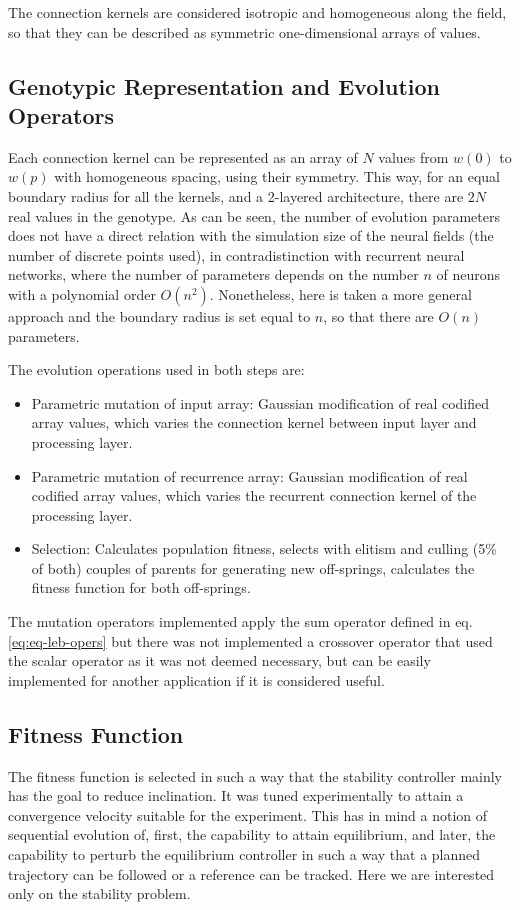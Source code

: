 The connection kernels are considered isotropic and homogeneous along
the field, so that they can be described as symmetric one-dimensional
arrays of values. 

\subsection{Genotypic Representation and Evolution Operators}
Each connection kernel can be represented as an array of $N$ values
from $w(0)$ to $w(p)$ with homogeneous spacing, using their
symmetry. This way, for an equal boundary radius for all the kernels,
and a 2-layered architecture, there are $2N$ real values in the
genotype. As can be seen, the number of evolution parameters does not
have a direct relation with the simulation size of the neural fields
(the number of discrete points used), in contradistinction with
recurrent neural networks, where the number of parameters depends on
the number $n$ of neurons with a polynomial order
$O(n^2)$. Nonetheless, here is taken a more general approach and the
boundary radius is set equal to $n$, so that there are $O(n)$
parameters.

The evolution operations used in both steps are:
\begin{itemize}
\item Parametric mutation of input array: Gaussian modification of
  real codified array values, which varies the connection kernel
  between input layer and processing layer.
\item Parametric mutation of recurrence array: Gaussian modification
  of real codified array values, which varies the recurrent connection
  kernel of the processing layer.
\item Selection: Calculates population fitness, selects with elitism
  and culling (5\% of both) couples of parents for generating new
  off-springs, calculates the fitness function for both off-springs.
\end{itemize}

The mutation operators implemented apply the sum operator defined in
eq. \ref{eq:eq-leb-opers} but there was not implemented a crossover
operator that used the scalar operator as it was not deemed necessary,
but can be easily implemented for another application if it is
considered useful.

\subsection{Fitness Function}
The fitness function is selected in such a way that the stability
controller mainly has the goal to reduce inclination. It was tuned
experimentally to attain a convergence velocity suitable for the
experiment. This has in mind a notion of sequential evolution of,
first, the capability to attain equilibrium, and later, the capability
to perturb the equilibrium controller in such a way that a planned
trajectory can be followed or a reference can be tracked. Here we are
interested only on the stability problem.

